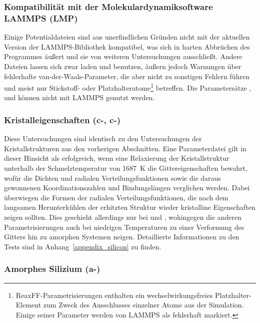 \subsubsection{Kompatibilität mit der Molekulardynamiksoftware LAMMPS (LMP)}

Einige Potentialdateien sind aus unerfindlichen Gründen nicht mit der aktuellen Version der LAMMPS-Bibliothek kompatibel, was sich in harten Abbrüchen des Programmes äußert und sie von weiteren Untersuchungen ausschließt.
Andere Dateien lassen sich zwar laden und benutzen, äußern jedoch Warnungen über fehlerhafte van-der-Waals-Parameter, die aber nicht zu sonstigen Fehlern führen und meist nur Stickstoff- oder Platzhalteratome\footnote{ReaxFF-Parametrisierungen enthalten ein wechselwirkungsfreies Platzhalter-Element  zum Zweck des Ausschlusses einzelner Atome aus der Simulation. Einige seiner Parameter werden von LAMMPS als fehlerhaft markiert.} betreffen.
Die Parametersätze ,  und  können nicht mit LAMMPS genutzt werden.

\subsubsection{Kristalleigenschaften (c-, c-)}

Diese Untersuchungen sind identisch zu den Untersuchungen der Kristallstrukturen aus den vorherigen Abschnitten.
Eine Parameterdatei gilt in dieser Hinsicht als erfolgreich, wenn eine Relaxierung der Kristallstruktur unterhalb der Schmelztemperatur von \SI{1687}{\kelvin}\cite{haynes_crc_2011} die Gittereigenschaften bewahrt, wofür die Dichten und radialen Verteilungsfunktionen sowie die daraus gewonnenen Koordinationszahlen und Bindungslängen verglichen werden.
Dabei überwiegen die Formen der radialen Verteilungsfunktionen, die nach dem langsamen Herunterkühlen der erhitzten Struktur wieder kristalline Eigenschaften zeigen sollten.
Dies geschieht allerdings nur bei  und , wohingegen die anderen Parametrisierungen auch bei niedrigen Temperaturen zu einer Verformung des Gitters hin zu amorphen Systemen neigen.
Detaillierte Informationen zu den Tests sind in Anhang~\ref{appendix_silicon} zu finden.

\subsubsection{Amorphes Silizium (a-)}

